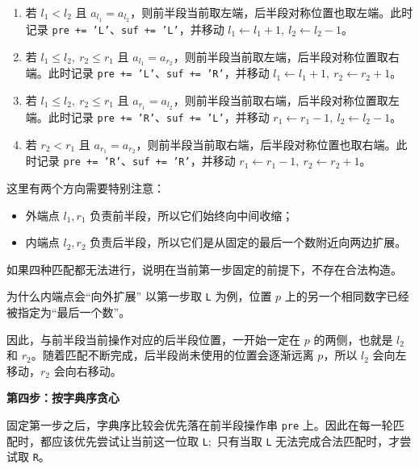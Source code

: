 \documentclass{book}
\newcommand{\code}[1]{\colorbox{codebg}{\texttt{#1}}}  %
\begin{document}
\begin{enumerate}[leftmargin=2em,itemsep=1pt,topsep=2pt,parsep=0pt,partopsep=0pt]
    \item 若 $l_1<l_2$ 且 $a_{l_1}=a_{l_2}$，则前半段当前取左端，后半段对称位置也取左端。此时记录 \code{pre += 'L'}、\code{suf += 'L'}，并移动
    $l_1\gets l_1+1,\ l_2\gets l_2-1$。

    \item 若 $l_1\le l_2,\ r_2\le r_1$ 且 $a_{l_1}=a_{r_2}$，则前半段当前取左端，后半段对称位置取右端。此时记录 \code{pre += 'L'}、\code{suf += 'R'}，并移动
    $l_1\gets l_1+1,\ r_2\gets r_2+1$。

    \item 若 $l_1\le l_2,\ r_2\le r_1$ 且 $a_{r_1}=a_{l_2}$，则前半段当前取右端，后半段对称位置取左端。此时记录 \code{pre += 'R'}、\code{suf += 'L'}，并移动
    $r_1\gets r_1-1,\ l_2\gets l_2-1$。

    \item 若 $r_2<r_1$ 且 $a_{r_1}=a_{r_2}$，则前半段当前取右端，后半段对称位置也取右端。此时记录 \code{pre += 'R'}、\code{suf += 'R'}，并移动
    $r_1\gets r_1-1,\ r_2\gets r_2+1$。
\end{enumerate}

这里有两个方向需要特别注意：

\begin{itemize}[leftmargin=2em,itemsep=1pt,topsep=2pt,parsep=0pt,partopsep=0pt]
    \item 外端点 $l_1,r_1$ 负责前半段，所以它们始终向中间收缩；
    \item 内端点 $l_2,r_2$ 负责后半段，所以它们是从固定的最后一个数附近向两边扩展。
\end{itemize}

如果四种匹配都无法进行，说明在当前第一步固定的前提下，不存在合法构造。

\begin{examplebox}{为什么内端点会“向外扩展”}
以第一步取 \code{L} 为例，位置 $p$ 上的另一个相同数字已经被指定为“最后一个数”。

因此，与前半段当前操作对应的后半段位置，一开始一定在 $p$ 的两侧，也就是 $l_2$ 和 $r_2$。随着匹配不断完成，后半段尚未使用的位置会逐渐远离 $p$，所以 $l_2$ 会向左移动，$r_2$ 会向右移动。
\end{examplebox}

\par\medskip
\noindent\textbf{第四步：按字典序贪心}
\par\medskip

固定第一步之后，字典序比较会优先落在前半段操作串 \code{pre} 上。因此在每一轮匹配时，都应该优先尝试让当前这一位取 \code{L}$;$ 只有当取 \code{L} 无法完成合法匹配时，才尝试取 \code{R}。
\end{document}
